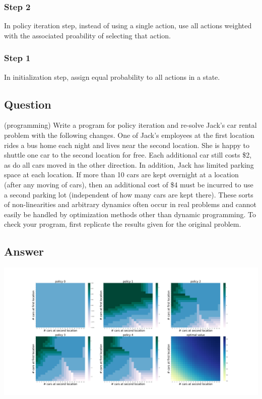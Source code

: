 \documentclass[11pt]{article}
\begin{document}
    \subsubsection*{Step 2}

    In policy iteration step, instead of using a single action, use all actions weighted with the associated proability of selecting that action.

    \subsubsection*{Step 1}

    In initialization step, assign equal probability to all actions in a state.

    \subsection{Question}

    (programming) Write a program for policy iteration and re-solve Jack’s car rental problem with the following changes.
    One of Jack’s employees at the first location rides a bus home each night and lives near the second location.
    She is happy to shuttle one car to the second location for free.
    Each additional car still costs \$2, as do all cars moved in the other direction.
    In addition, Jack has limited parking space at each location.
    If more than 10 cars are kept overnight at a location (after any moving of cars), then an additional cost of \$4 must be incurred to use a second parking lot (independent of how many cars are kept there).
    These sorts of non-linearities and arbitrary dynamics often occur in real problems and cannot easily be handled by optimization methods other than dynamic programming.
    To check your program, first replicate the results given for the original problem.

    \subsection*{Answer}

    \includegraphics[scale=0.15]{figure_4_2_e_4_7}
\end{document}
